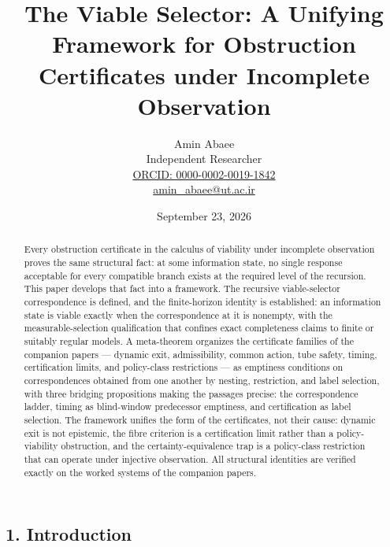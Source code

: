 \documentclass[10pt,twocolumn]{article}
\theoremstyle{definition}
\begin{document}
\title{The Viable Selector: A Unifying Framework for Obstruction\\ Certificates under Incomplete Observation}
\author{Amin Abaee\\[0.35em]
{\small Independent Researcher}\\[0.55em]
{\small\href{https://orcid.org/0000-0002-0019-1842}{ORCID: 0000-0002-0019-1842}}\\[0.3em]
{\small\href{mailto:amin\_abaee@ut.ac.ir}{amin\_abaee@ut.ac.ir}}}
\date{September 23, 2026}
\maketitle

\begin{abstract}

Every obstruction certificate in the calculus of viability under incomplete
observation proves the same structural fact: at some information state, no
single response acceptable for every compatible branch exists at the
required level of the recursion. This paper develops that fact into a
framework. The recursive viable-selector correspondence is defined, and the
finite-horizon identity is established: an information state is viable
exactly when the correspondence at it is nonempty, with the measurable-selection
qualification that confines exact completeness claims to finite or suitably
regular models. A meta-theorem organizes the certificate families of the
companion papers --- dynamic exit, admissibility, common action, tube safety,
timing, certification limits, and policy-class restrictions --- as emptiness
conditions on correspondences obtained from one another by nesting,
restriction, and label selection, with three bridging propositions making
the passages precise: the correspondence ladder, timing as blind-window
predecessor emptiness, and certification as label selection. The framework
unifies the form of the certificates, not their cause: dynamic exit is not
epistemic, the fibre criterion is a certification limit rather than a
policy-viability obstruction, and the certainty-equivalence trap is a
policy-class restriction that can operate under injective observation. All
structural identities are verified exactly on the worked systems of the
companion papers.

\end{abstract}

\subsection{1. Introduction}\label{introduction}
\end{document}
